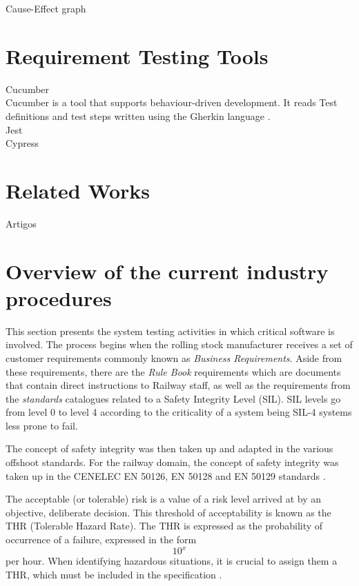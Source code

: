 Cause-Effect graph 


\section{Requirement Testing Tools}
\label{subsec:requirement_testing}

Cucumber\\
Cucumber is a tool that supports behaviour-driven development. It reads Test definitions and test steps written using the Gherkin language \cite{cucumber}.\\

Jest\\
Cypress\\

\section{Related Works}
\label{sec:related_works}

Artigos\\

\section{Overview of the current industry procedures}
\label{sec:current_procedures}

This section presents the system testing activities in which critical software is involved.
The process begins when the rolling stock manufacturer receives a set of customer requirements commonly known as \textit{Business Requirements}. Aside from these requirements, there are the \textit{Rule Book} requirements which are documents that contain direct instructions to Railway staff, as well as the requirements from the \textit{standards} catalogues related to a Safety Integrity Level (SIL). SIL levels go from level 0 to level 4 according to the criticality of a system being SIL-4 systems less prone to fail. 

The concept of safety integrity was then taken up and adapted in the
various offshoot standards. For the railway domain, the concept of safety
integrity was taken up in the CENELEC EN 50126, EN 50128 and EN
50129 standards \cite{cenelec50128}.

The acceptable (or tolerable) risk is a value of a risk level arrived at by an
objective, deliberate decision. This threshold of acceptability is known as the
THR (Tolerable Hazard Rate). The THR is expressed as the probability of
occurrence of a failure, expressed in the form \[ 10^x \] per hour. When
identifying hazardous situations, it is crucial to assign them a THR, which
must be included in the specification \cite{cenelec50128}.

